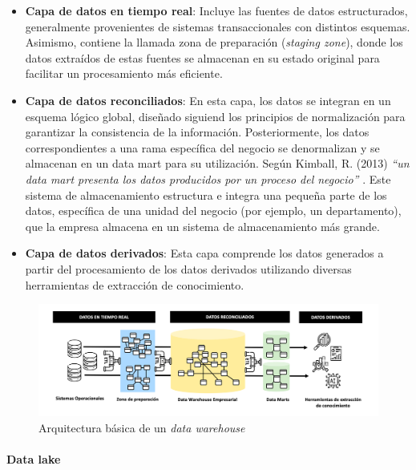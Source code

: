 \begin{itemize}
    \item \textbf{Capa de datos en tiempo real}: Incluye las fuentes de datos estructurados, 
    generalmente provenientes de sistemas transaccionales con distintos esquemas. 
    Asimismo, contiene la llamada zona de preparación (\textit{staging zone}), 
    donde los datos extraídos de estas fuentes se almacenan en su estado original 
    para facilitar un procesamiento más eficiente.
    \item \textbf{Capa de datos reconciliados}: 
    En esta capa, los datos se integran en un esquema lógico global, 
    diseñado siguiend los principios de normalización para garantizar la consistencia de la información. 
    Posteriormente, los datos correspondientes a una rama específica del negocio se denormalizan 
    y se almacenan en un data mart para su utilización.
    Según Kimball, R. (2013) \textit{``un data mart presenta los datos producidos por un proceso del negocio''} \cite{kimball2013data}.
Este sistema de almacenamiento 
estructura e integra una pequeña parte de los datos,
específica de una unidad del negocio (por ejemplo, un departamento),
que la empresa almacena en un sistema de almacenamiento más grande.
    \item \textbf{Capa de datos derivados}: Esta capa comprende los datos generados
    a partir del procesamiento de los datos derivados utilizando diversas herramientas de extracción de conocimiento.
\end{itemize}

\begin{figure}[h!]
    \centering
    \includegraphics[width=\textwidth]{Images/dw-architecture.png}
    \caption{Arquitectura básica de un \textit{data warehouse}}
    \label{fig:dw-architecture}
\end{figure}


\paragraph{Data lake\newline}


